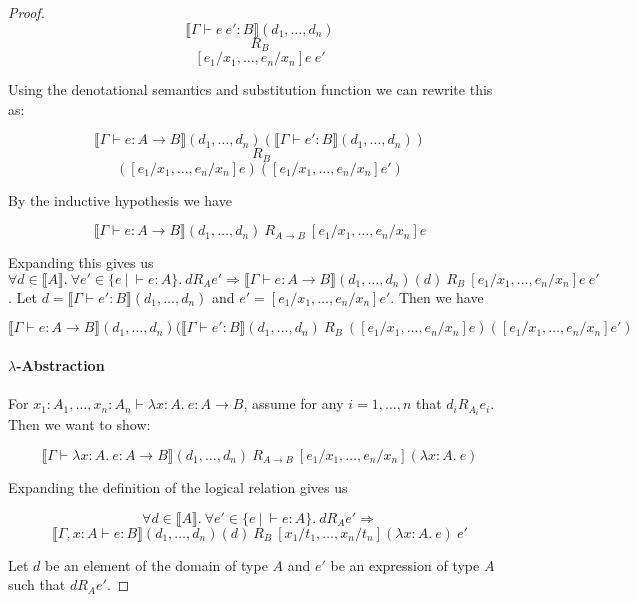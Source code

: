 \begin{proof}
\[ \llbracket \Gamma \vdash  e \ e' : B \rrbracket (d_1, \dots, d_n) \]
\[ R_B \]
\[ [e_1/x_1, \dots, e_n/x_n]e \ e' \]

Using the denotational semantics and substitution function we can rewrite this as:

\[ \llbracket \Gamma \vdash  e : A \to B \rrbracket (d_1, \dots, d_n) (\llbracket \Gamma \vdash e' : B \rrbracket (d_1, \dots, d_n))\]
\[ \ R_B \]
\[ ([e_1/x_1, \dots, e_n/x_n]e) ([e_1/x_1, \dots, e_n/x_n] e') \]

By the inductive hypothesis we have

\[\llbracket \Gamma \vdash  e : A \to B \rrbracket (d_1, \dots, d_n) \ R_{A \to B} \ [e_1/x_1, \dots, e_n/x_n]e\]


Expanding this gives us $ \forall d \in \llbracket A \rrbracket. \ \forall e' \in \{ e \ | \ \vdash e : A\}. \ d R_A e' \Rightarrow \llbracket \Gamma \vdash  e : A \to B \rrbracket (d_1, \dots, d_n) (d) \  R_B \ [e_1/x_1, \dots, e_n/x_n]e \ e'$. Let $d = \llbracket \Gamma \vdash e' : B \rrbracket (d_1, \dots, d_n)$ and $e' = [e_1/x_1, \dots, e_n/x_n]e'$. Then we have 

\[\llbracket \Gamma \vdash  e : A \to B \rrbracket (d_1, \dots, d_n) (\llbracket \Gamma \vdash e' : B \rrbracket (d_1, \dots, d_n) \ R_B \ ([e_1/x_1, \dots, e_n/x_n]e) ([e_1/x_1, \dots, e_n/x_n] e')\]

\paragraph{$\lambda$-Abstraction} 
For $x_1 : A_1, \dots, x_n : A_n \vdash \lambda x : A. \ e : A \to B$, assume for any $i = 1, \dots, n$ that $d_i R_{A_i} e_i$. Then we want to show:

\[ \llbracket \Gamma \vdash \lambda x : A. \ e : A \to B \rrbracket (d_1, \dots, d_n) \ R_{A \to B} \ [e_1/x_1, \dots, e_n/x_n] (\lambda x : A. \ e) \]



Expanding the definition of the logical relation gives us

\[ \forall d \in \llbracket A \rrbracket. \ \forall e' \in \{ e \ | \ \vdash e : A\}. \ d R_A e' \Rightarrow\]
\[ \llbracket \Gamma ,x:A \vdash e : B \rrbracket(d_1, \dots, d_n) (d) \ R_B \  [x_1/t_1, \dots, x_n/t_n](\lambda x:A. \ e) \ e'\]

Let $d$ be an element of the domain of type $A$ and $e'$ be an expression of type $A$ such that $d R_A  e'$.


\end{proof}
